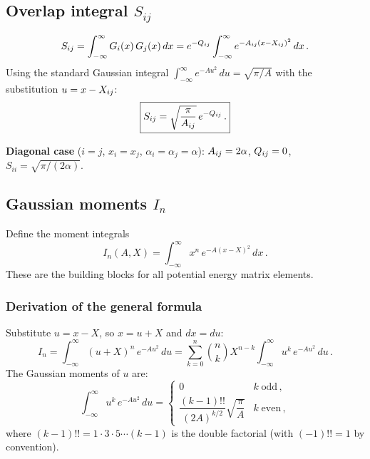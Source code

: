 \subsection{Overlap integral $S_{ij}$}\label{sec:Gauss_overlap}

\begin{equation}
  S_{ij} = \int_{-\infty}^{\infty}G_i(x)\,G_j(x)\,dx
  = e^{-Q_{ij}}\int_{-\infty}^{\infty}e^{-A_{ij}(x-X_{ij})^2}\,dx\,.
\end{equation}
Using the standard Gaussian integral $\int_{-\infty}^{\infty}e^{-Au^2}\,du = \sqrt{\pi/A}$ with
the substitution $u = x - X_{ij}$:
\begin{equation}\label{eq:Gauss_S}
  \boxed{S_{ij} = \sqrt{\frac{\pi}{A_{ij}}}\,e^{-Q_{ij}}\,.}
\end{equation}

\textbf{Diagonal case} ($i = j$, $x_i = x_j$, $\alpha_i = \alpha_j = \alpha$):
$A_{ij} = 2\alpha$, $Q_{ij} = 0$, $S_{ii} = \sqrt{\pi/(2\alpha)}$.

\subsection{Gaussian moments $I_n$}\label{sec:Gauss_moments}

Define the moment integrals
\begin{equation}\label{eq:In_def}
  I_n(A, X) = \int_{-\infty}^{\infty}x^n\,e^{-A(x-X)^2}\,dx\,.
\end{equation}
These are the building blocks for all potential energy matrix elements.

\subsubsection{Derivation of the general formula}

Substitute $u = x - X$, so $x = u + X$ and $dx = du$:
\begin{equation}
  I_n = \int_{-\infty}^{\infty}(u+X)^n\,e^{-Au^2}\,du
  = \sum_{k=0}^{n}\binom{n}{k}X^{n-k}\int_{-\infty}^{\infty}u^k\,e^{-Au^2}\,du\,.
\end{equation}
The Gaussian moments of $u$ are:
\begin{equation}\label{eq:u_moments}
  \int_{-\infty}^{\infty}u^k\,e^{-Au^2}\,du =
  \begin{cases}
    0 & k\;\text{odd}\,,\\[4pt]
    \dfrac{(k-1)!!}{(2A)^{k/2}}\sqrt{\dfrac{\pi}{A}} & k\;\text{even}\,,
  \end{cases}
\end{equation}
where $(k-1)!! = 1\cdot 3\cdot 5\cdots(k-1)$ is the double factorial (with $(-1)!! = 1$ by convention).

